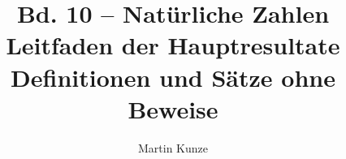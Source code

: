 \documentclass[main.tex]{subfiles}
\title{Bd. 10 -- Natürliche Zahlen\\[.7em]
  \large Leitfaden der Hauptresultate\\[.3em]
  \normalsize Definitionen und Sätze ohne Beweise}
\author{Martin Kunze}
\date{}
\begin{document}
\hypersetup{pageanchor=false}
\maketitle
\hypersetup{pageanchor=true,hypertexnames=false}
\setcounter{tocdepth}{1}
\begingroup
\normalsize
\makeatletter
\patchcmd{\@makeschapterhead}{\vspace*{50\p@}}{\vspace*{8\p@}}
  {}{\PackageError{b10-guide}{TOC heading top spacing patch failed}{}}
  {}{\PackageError{b10-guide}{TOC heading bottom spacing patch failed}{}}
\patchcmd{\l@chapter}{\vskip 1.0em \@plus\p@}{\vskip .3em \@plus\p@}
  {}{\PackageError{b10-guide}{TOC chapter spacing patch failed}{}}
\makeatother
\tableofcontents
\endgroup












\end{document}
